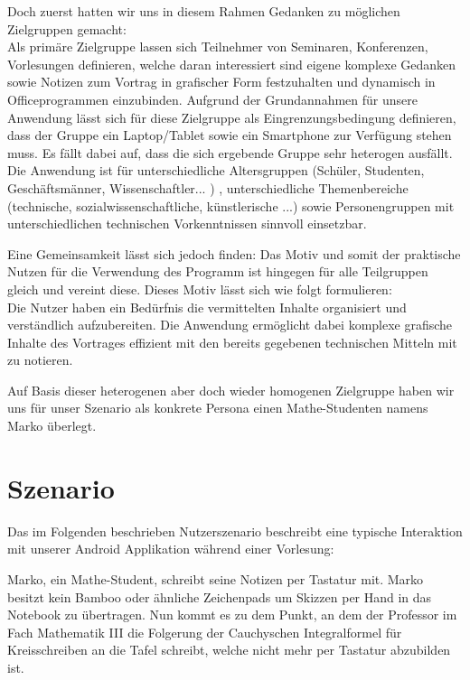 \documentclass{chi-ext}
\begin{document}
Doch zuerst hatten wir uns in diesem Rahmen Gedanken zu möglichen Zielgruppen gemacht: \\
Als primäre Zielgruppe lassen sich Teilnehmer von Seminaren, Konferenzen, Vorlesungen definieren, welche daran interessiert sind eigene komplexe Gedanken sowie Notizen zum Vortrag in grafischer Form festzuhalten und dynamisch in Officeprogrammen einzubinden.
Aufgrund der Grundannahmen für unsere Anwendung lässt sich für diese Zielgruppe als Eingrenzungsbedingung definieren, dass der Gruppe ein Laptop/Tablet sowie ein Smartphone zur Verfügung stehen muss. 
Es fällt dabei auf, dass die sich ergebende Gruppe sehr heterogen ausfällt. Die Anwendung ist für unterschiedliche Altersgruppen (Schüler, Studenten, Geschäftsmänner, Wissenschaftler... ) , unterschiedliche Themenbereiche (technische, sozialwissenschaftliche, künstlerische ...) sowie Personengruppen mit unterschiedlichen technischen Vorkenntnissen sinnvoll einsetzbar.

Eine Gemeinsamkeit lässt sich jedoch finden: Das Motiv und somit der praktische Nutzen für die Verwendung des Programm ist hingegen für alle Teilgruppen gleich und vereint diese.
Dieses Motiv lässt sich wie folgt formulieren:\\
Die Nutzer haben ein Bedürfnis die vermittelten Inhalte organisiert und verständlich aufzubereiten. Die Anwendung ermöglicht dabei komplexe grafische Inhalte des Vortrages effizient mit den bereits gegebenen technischen Mitteln mit zu notieren.

Auf Basis dieser heterogenen aber doch wieder homogenen Zielgruppe haben wir uns für unser Szenario als konkrete Persona einen Mathe-Studenten namens Marko überlegt.


\section{Szenario}
Das im Folgenden beschrieben Nutzerszenario beschreibt eine typische Interaktion mit unserer Android Applikation während einer Vorlesung:


Marko, ein Mathe-Student, schreibt seine Notizen per Tastatur mit. Marko besitzt kein Bamboo oder ähnliche Zeichenpads um Skizzen per Hand in das Notebook zu übertragen. Nun kommt es zu dem Punkt, an dem der Professor im Fach Mathematik III die Folgerung der Cauchyschen Integralformel für Kreisschreiben an die Tafel schreibt, welche nicht mehr per Tastatur abzubilden ist.
\end{document}
